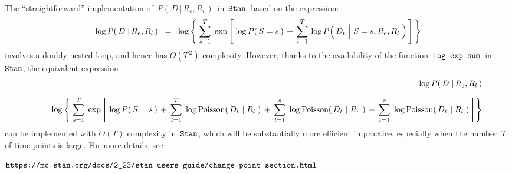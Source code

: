\vskip 0.5cm
\begin{remark}
\mbox{}
\vskip 0.2cm
\noindent
The ``straightforward'' implementation of \,$P\!\left(\,D\,\vert\,R_{e},R_{l}\,\right)$\,
in \,$\textnormal{\texttt{Stan}}$\, based on the expression:
\begin{eqnarray*}
\underset{{\color{white}}}{\log P\!\left(\,D \;\vert\, R_{e},R_{l}\,\right)}
\;\; = \;\;
	\log\left\{\;
	\overset{T}{\underset{s=1}{\sum}}\;
	\exp\left[\;
		\log P\!\left(\,S=s\,\right)
		\, + \,
		\overset{T}{\underset{t=1}{\sum}}\,
		\log P\!\left(\,D_{t} \,\left\vert\; S\overset{{\color{white}1}}{=}s,R_{e},R_{l}\right.\,\right)
		\,\right]
	\,\right\}
\end{eqnarray*}
involves a doubly nested loop, and hence has $O(T^{\,2})$ complexity.
However, thanks to the availability of the function
\,$\textnormal{\texttt{log\_exp\_sum}}$\, in \,$\textnormal{\texttt{Stan}}$,
the equivalent expression
\begin{eqnarray*}
&&
	\underset{{\color{white}}}{\log P\!\left(\,D \;\vert\, R_{e},R_{l}\,\right)}
\\
&=&
	\log\left\{\;
	\overset{T}{\underset{s=1}{\sum}}\;
	\exp\left[\;
			\log P\!\left(\,S=s\,\right)
			\,+\,
			\overset{T}{\underset{t=1}{\sum}}\;
			\log\textnormal{Poisson}\!\left(\,D_{t} \,\left\vert\; R_{l}\right.\,\right)
			\,+\,
			\overset{s}{\underset{t=1}{\sum}}\;
			\log\textnormal{Poisson}\!\left(\,D_{t} \,\left\vert\; R_{e}\right.\,\right)
			\,-\,
			\overset{s}{\underset{t=1}{\sum}}\;
			\log\textnormal{Poisson}\!\left(\,D_{t} \,\left\vert\; R_{l}\right.\,\right)
		\,\right]
	\right\}
\end{eqnarray*}
can be implemented with $O(T)$ complexity in \,$\textnormal{\texttt{Stan}}$,
which will be substantially more efficient in practice, especially when the number \,$T$\, of time points is large.
For more details, see
\begin{center}
$\textnormal{\texttt{https://mc-stan.org/docs/2\_23/stan-users-guide/change-point-section.html}}$
\end{center}
\end{remark}

